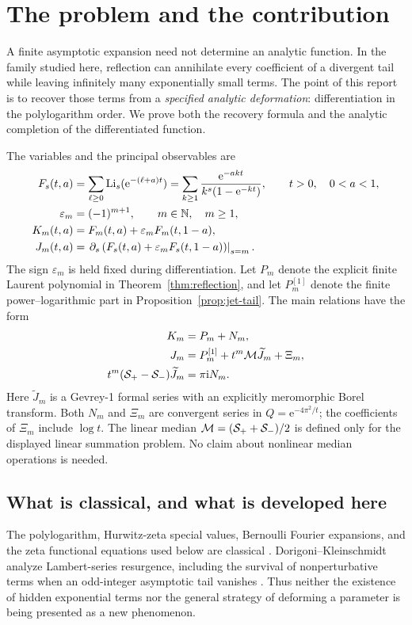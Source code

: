 \documentclass[11pt,a4paper]{article}
\numberwithin{equation}{section}
\theoremstyle{definition}\newtheorem{definition}[theorem]{Definition}
\theoremstyle{remark}\newtheorem{remark}[theorem]{Remark}
\newcommand{\N}{\mathbb N}\newcommand{\Z}{\mathbb Z}
\newcommand{\ii}{\mathrm i}\newcommand{\e}{\mathrm e}
\newcommand{\Sm}{\mathcal S_-}\newcommand{\Med}{\mathcal M}
\newcommand{\eps}{\varepsilon}\newcommand{\muh}{\widehat\mu}
\begin{document}
\section{The problem and the contribution}
\label{sec:scope}

A finite asymptotic expansion need not determine an analytic function.
In the family studied here, reflection can annihilate every coefficient
of a divergent tail while leaving infinitely many exponentially small
terms. The point of this report is to recover those terms from a
\emph{specified analytic deformation}: differentiation in the
polylogarithm order. We prove both the recovery formula and the analytic
completion of the differentiated function.

The variables and the principal observables are
\begin{align}
 F_s(t,a)&=\sum_{\ell\ge0}\Li_s(\e^{-(\ell+a)t})
       =\sum_{k\ge1}\frac{\e^{-akt}}{k^s(1-\e^{-kt})},
       \qquad t>0,\quad0<a<1,\label{eq:F}\\
 \eps_m&=(-1)^{m+1},\qquad m\in\N,\quad m\ge1,\notag\\
 K_m(t,a)&=F_m(t,a)+\eps_mF_m(t,1-a),\label{eq:K}\\
 J_m(t,a)&=\left.\partial_s\left(F_s(t,a)
                    +\eps_mF_s(t,1-a)\right)\right|_{s=m}.
                    \label{eq:J}
\end{align}
The sign $\eps_m$ is held fixed during differentiation.
Let $P_m$ denote the explicit finite Laurent polynomial in
Theorem~\ref{thm:reflection}, and let $P_m^{[1]}$ denote the finite
power--logarithmic part in Proposition~\ref{prop:jet-tail}.
The main relations have the form
\begin{align}
 K_m&=P_m+N_m,\label{eq:overview-base}\\
 J_m&=P_m^{[1]}+t^m\Med\widetilde J_m+\Xi_m,\label{eq:overview-jet}\\
 t^m(\Sp-\Sm)\widetilde J_m&=\pi\ii N_m.\label{eq:overview-jump}
\end{align}
Here $\widetilde J_m$ is a Gevrey-1 formal series with an explicitly
meromorphic Borel transform. Both $N_m$ and $\Xi_m$ are convergent series
in $Q=\e^{-4\pi^2/t}$; the coefficients of $\Xi_m$ include $\log t$.
The linear median $\Med=(\Sp+\Sm)/2$ is defined only for the displayed
linear summation problem. No claim about nonlinear median operations
is needed.

\subsection{What is classical, and what is developed here}
The polylogarithm, Hurwitz-zeta special values, Bernoulli Fourier
expansions, and the zeta functional equations used below are classical
\cite{dlmf}. Dorigoni--Kleinschmidt analyze Lambert-series resurgence,
including the survival of nonperturbative terms when an odd-integer
asymptotic tail vanishes \cite[Section~2.2]{dk}. Thus neither the existence
of hidden exponential terms nor the general strategy of deforming a
parameter is being presented as a new phenomenon.
\end{document}
